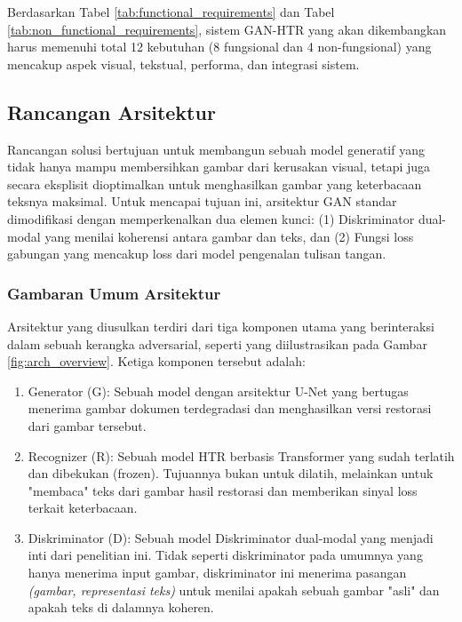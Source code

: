 \documentclass[12pt,a4paper]{article}
\begin{document}
\vspace{1.5em}

Berdasarkan Tabel \ref{tab:functional_requirements} dan Tabel \ref{tab:non_functional_requirements}, sistem GAN-HTR yang akan dikembangkan harus memenuhi total 12 kebutuhan (8 fungsional dan 4 non-fungsional) yang mencakup aspek visual, tekstual, performa, dan integrasi sistem.

\subsection{Rancangan Arsitektur} %

Rancangan solusi bertujuan untuk membangun sebuah model generatif yang tidak hanya mampu membersihkan gambar dari kerusakan visual, tetapi juga secara eksplisit dioptimalkan untuk menghasilkan gambar yang keterbacaan teksnya maksimal. Untuk mencapai tujuan ini, arsitektur GAN standar dimodifikasi dengan memperkenalkan dua elemen kunci: (1) Diskriminator dual-modal yang menilai koherensi antara gambar dan teks, dan (2) Fungsi loss gabungan yang mencakup loss dari model pengenalan tulisan tangan.

\subsubsection{Gambaran Umum Arsitektur} %
Arsitektur yang diusulkan terdiri dari tiga komponen utama yang berinteraksi dalam sebuah kerangka adversarial, seperti yang diilustrasikan pada Gambar \ref{fig:arch_overview}. Ketiga komponen tersebut adalah:
\begin{enumerate}[nosep]
    \item Generator (G): Sebuah model dengan arsitektur U-Net yang bertugas menerima gambar dokumen terdegradasi dan menghasilkan versi restorasi dari gambar tersebut.
    \item Recognizer (R): Sebuah model HTR berbasis Transformer yang sudah terlatih dan dibekukan (frozen). Tujuannya bukan untuk dilatih, melainkan untuk "membaca" teks dari gambar hasil restorasi dan memberikan sinyal loss terkait keterbacaan.
    \item Diskriminator (D): Sebuah model Diskriminator dual-modal yang menjadi inti dari penelitian ini. Tidak seperti diskriminator pada umumnya yang hanya menerima input gambar, diskriminator ini menerima pasangan \textit{(gambar, representasi teks)} untuk menilai apakah sebuah gambar "asli" dan apakah teks di dalamnya koheren.
\end{enumerate}
\end{document}
